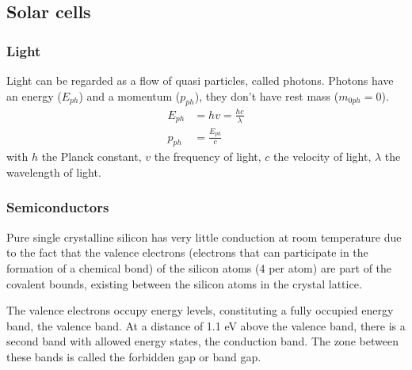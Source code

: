 \documentclass[a4paper,10pt]{article}
\begin{document}
\subsection{Solar cells}
\subsubsection{Light}
Light can be regarded as a flow of quasi particles, called photons. Photons have an energy ($E_{ph}$) and a momentum ($p_{ph}$), they don't have rest mass ($m_{0ph} = 0$).
\begin{align}
 E_{ph} &= hv = \frac{hc}{\lambda} \\
 p_{ph} &= \frac{E_{ph}}{c}  
\end{align}
with $h$ the Planck constant, $v$ the frequency of light, $c$ the velocity of light, $\lambda$ the wavelength of light.

\subsubsection{Semiconductors}

Pure single crystalline silicon has very little conduction at room temperature due to the fact that the valence electrons (electrons that can participate in the formation of a chemical bond) of the silicon atoms (4 per atom) are part of the covalent bounds, existing between the silicon atoms in the crystal lattice. \bigskip

The valence electrons occupy energy levels, constituting a fully occupied energy band, the valence band. At a distance of 1.1 eV above the valence band, there is a second band with allowed energy states, the conduction band. The zone between these bands is called the forbidden gap or band gap.
\end{document}
